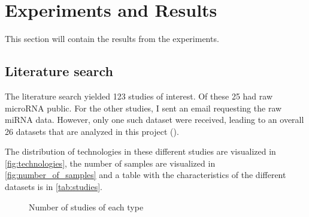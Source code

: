 \chapter{Experiments and Results}
\label{cha:ResearchAndResults}

This section will contain the results from the experiments. 

\section{Literature search}
The literature search yielded 123 studies of interest. Of these 25 had raw microRNA public. For the other studies, I sent an email requesting the raw miRNA data. However, only one such dataset were received, leading to an overall 26 datasets that are analyzed in this project ().

The distribution of technologies in these different studies are visualized in \autoref{fig:technologies}, the number of samples are visualized in \autoref{fig:number_of_samples} and a table with the characteristics of the different datasets is in \autoref{tab:studies}.

\begin{figure}
    \centering
    \caption{Number of studies of each type}
    \label{fig:technologies}
\end{figure}

